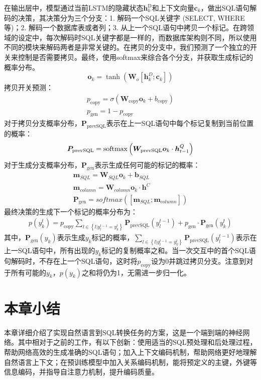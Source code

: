 在输出层中，模型通过当前LSTM的隐藏状态$\bm{h}_k^\mathrm{D}$和上下文向量$\bm{c}_k$，做出SQL语句解码的决策，其决策分为三个分支：1. 解码一个SQL关键字 (SELECT, WHERE等)；2. 解码一个数据库表或者列；3. 从上一个SQL语句中拷贝一个标记。在跨领域的设定中，每次解码时SQL关键字都是一样的，而数据库架构则不同，所以使用不同的模块来解码两者是非常关键的。在拷贝的分支中，我们预测了一个独立的开关来控制是否需要拷贝。最终，使用softmax来综合各个分支，并获取生成标记的概率分布。
\begin{equation}
    \bm{o}_k=\tanh{\left(\bm{W}_o\left[\bm{h}_k^D;\bm{c}_k\right]\right)}
\end{equation}
拷贝开关预测：
\begin{align}
    p_\mathrm{copy}=\sigma\left(\bm{W}_\mathrm{copy}\bm{o}_k+b_\mathrm{copy}\right)\\
    p_\mathrm{gen}=1-p_\mathrm{copy}
\end{align}
对于拷贝分支概率分布，$\bm{P}_\mathrm{prevSQL}$表示在上一SQL语句中每个标记复制到当前位置的概率：
\begin{align}
    \bm{P}_\mathrm{prevSQL}=\mathrm{softmax}\left(\bm{W}_\mathrm{prevSQL}\bm{o}_k\cdot\bm{h}_{t-1}^Q\right)
\end{align}
对于生成分支概率分布，$\bm{P}_\mathrm{gen}$表示生成任何可能的标记的概率：
\begin{align}
\bm{m}_{SQL}=\bm{W}_{SQL}\bm{o}_k+\bm{b}_{SQL}\\
\bm{m}_{column}=\bm{W}_{column}\bm{o}_k\cdot\bm{h}^C\\
\bm{P}_\mathrm{gen}=softmax\left(\left[\bm{m}_{SQL};\bm{m}_{column}\right]\right)
\end{align}
最终决策的生成下一个标记的概率分布为：
\begin{align}
p\left(y_k^t\right)=p_\mathrm{copy}\sum_{l\in\left\{l|y_l^{t-1}=y_k^t\right\}}{\bm{P}_\mathrm{prevSQL}\left(y_l^{t-1}\right)}+p_\mathrm{gen}\cdot\bm{P}_\mathrm{gen}(y_k^t)
\end{align}
其中，$\bm{P}_\mathrm{gen}(y_k)$表示生成$y_k$标记的概率，$\sum_{l\in\left\{l|y_l^{t-1}=y_k^t\right\}}{\bm{P}_\mathrm{prevSQL}\left(y_l^{t-1}\right)}$表示在上一SQL语句中，所有出现的$y_k$标记的复制概率之和。当一次交互中的首个SQL语句解码时，不存在上一个SQL语句，这时将$p_\mathrm{copy}$设为0并跳过拷贝分支。注意到对于所有可能的$y_k$，$p\left(y_k\right)$之和将仍为1，无需进一步归一化。

\section{本章小结}

本章详细介绍了实现自然语言到SQL转换任务的方案，这是一个端到端的神经网络。其中相对于之前的工作，有以下创新：使用适当的SQL预处理和后处理过程，帮助网络高效的生成准确的SQL语句；加入上下文编码机制，帮助网络更好地理解自然语言上下文；在预训练模型中加入关系编码机制，能将预定义的主键，外键等信息编码，并指导自注意力机制，提升编码质量。
